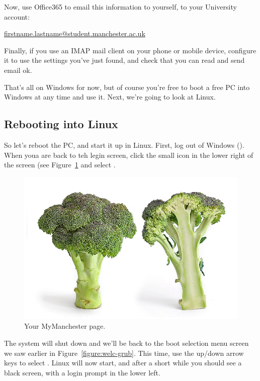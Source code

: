 \splunge

Now, use Office365 to email this information to yourself, to your
University account:

\url{firstname.lastname@student.manchester.ac.uk}

Finally, if you use an IMAP mail client on your phone or mobile
device, configure it to use the settings you've just found, and check
that you can read and send email ok.

That's all on Windows for now, but of course you're free to boot a
free PC into Windows at any time and use it. Next, we're going to look at Linux.

\subsection{Rebooting into Linux}
\label{sec:rebooting-into-linux}

So let's reboot the PC, and start it up in Linux. First, log out of
Windows (\splunge). When youa are back to teh legin screen, click the
small icon in the lower right of the screen (see Figure~\ref{figure:welc-winicon} and select \splunge.

\begin{figure}
\centerline{\includegraphics[width=15cm]{images/broccoli.jpg}}
\caption{Your MyManchester page.}
\label{figure:welc-winicon}
\end{figure}

The system will shut down and we'll be back to the boot selection menu
screen we saw earlier in Figure~\ref{figure:welc-grub}. This time, use
the up/down arrow keys to select \splunge. Linux will now start, and
after a short while you should see a black screen, with a login prompt
in the lower left. 

